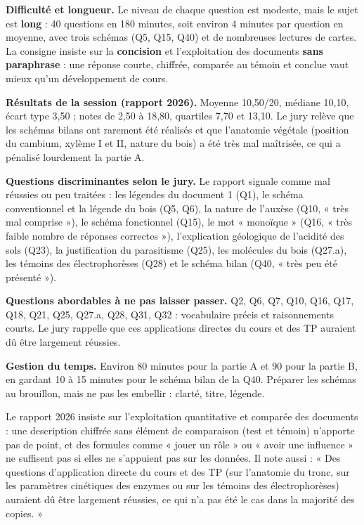 \documentclass[11pt,a4paper]{article}
\begin{document}
\textbf{Difficulté et longueur.} Le niveau de chaque question est modeste, mais le sujet est \textbf{long} : 40 questions en 180 minutes, soit environ 4 minutes par question en moyenne, avec trois schémas (Q5, Q15, Q40) et de nombreuses lectures de cartes. La consigne insiste sur la \textbf{concision} et l'exploitation des documents \textbf{sans paraphrase} : une réponse courte, chiffrée, comparée au témoin et conclue vaut mieux qu'un développement de cours.

\textbf{Résultats de la session (rapport 2026).} Moyenne 10,50/20, médiane 10,10, écart type 3,50 ; notes de 2,50 à 18,80, quartiles 7,70 et 13,10. Le jury relève que les schémas bilans ont rarement été réalisés et que l'anatomie végétale (position du cambium, xylème I et II, nature du bois) a été très mal maîtrisée, ce qui a pénalisé lourdement la partie A.

\textbf{Questions discriminantes selon le jury.} Le rapport signale comme mal réussies ou peu traitées : les légendes du document 1 (Q1), le schéma conventionnel et la légende du bois (Q5, Q6), la nature de l'auxèse (Q10, « très mal comprise »), le schéma fonctionnel (Q15), le mot « monoïque » (Q16, « très faible nombre de réponses correctes »), l'explication géologique de l'acidité des sols (Q23), la justification du parasitisme (Q25), les molécules du bois (Q27.a), les témoins des électrophorèses (Q28) et le schéma bilan (Q40, « très peu été présenté »).

\textbf{Questions abordables à ne pas laisser passer.} Q2, Q6, Q7, Q10, Q16, Q17, Q18, Q21, Q25, Q27.a, Q28, Q31, Q32 : vocabulaire précis et raisonnements courts. Le jury rappelle que ces applications directes du cours et des TP auraient dû être largement réussies.

\textbf{Gestion du temps.} Environ 80 minutes pour la partie A et 90 pour la partie B, en gardant 10 à 15 minutes pour le schéma bilan de la Q40. Préparer les schémas au brouillon, mais ne pas les embellir : clarté, titre, légende.

\begin{jury}

Le rapport 2026 insiste sur l'exploitation quantitative et comparée des documents : une description chiffrée sans élément de comparaison (test et témoin) n'apporte pas de point, et des formules comme « jouer un rôle » ou « avoir une influence » ne suffisent pas si elles ne s'appuient pas sur les données. Il note aussi : « Des questions d'application directe du cours et des TP (sur l'anatomie du tronc, sur les paramètres cinétiques des enzymes ou sur les témoins des électrophorèses) auraient dû être largement réussies, ce qui n'a pas été le cas dans la majorité des copies. »

\end{jury}
\end{document}
